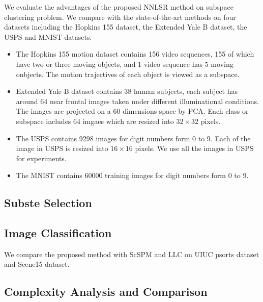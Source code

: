 \documentclass[10pt,twocolumn,letterpaper]{article}
\begin{document}
We evaluate the advantages of the proposed NNLSR method on subspace clustering problem. We compare with the state-of-the-art methods on four datasets including the Hopkins 155 dataset, the Extended Yale B dataset, the USPS and MNIST datasets. 

\begin{itemize}
\item The Hopkins 155 motion dataset contains 156 video sequences, 155 of which have two or three moving objects, and 1 video sequence has 5 moving onbjects. The motion trajectives of each object is viewed as a subspace. 

\item Extended Yale B dataset contains 38 human subjects, each subject has around 64 near frontal images taken under different illuminational conditions. The images are projected on a 60 dimensions space by PCA. Each class or subspace includes 64 imgaes which are resized into $32\times32$ pixels. 

\item The USPS contains 9298 images for digit numbers form 0 to 9. Each of the image in USPS is resized into $16\times16$ pixels. We use all the images in USPS for experiments.

\item The MNIST contains 60000 training images for digit numbers form 0 to 9.
\end{itemize}


\subsection{Subste Selection}





\subsection{Image Classification}
We compare the proposed method with ScSPM \cite{} and LLC \cite{} on UIUC psorts dataset \cite{} and Scene15 \cite{} dataset. 


\subsection{Complexity Analysis and Comparison}

{
\small


}
\end{document}
